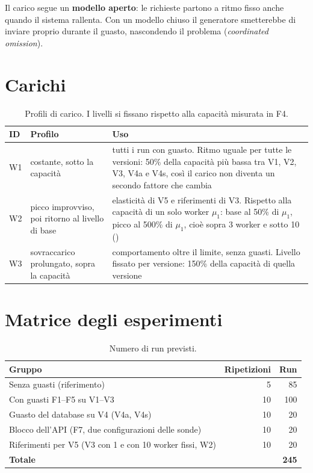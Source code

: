 Il carico segue un \textbf{modello aperto}: le richieste partono a ritmo fisso anche quando il sistema rallenta. Con un modello chiuso il generatore smetterebbe di inviare proprio durante il guasto, nascondendo il problema (\textit{coordinated omission}).

\section{Carichi}

\begin{table}[htbp]
\centering
\caption{Profili di carico. I livelli si fissano rispetto alla capacità misurata in F4.}
\label{tab:carichi}
\begin{tabularx}{\linewidth}{@{}llL@{}}
\toprule
\textbf{ID} & \textbf{Profilo} & \textbf{Uso} \\
\midrule
W1 & costante, sotto la capacità & tutti i run con guasto. Ritmo uguale per tutte le versioni: 50\% della capacità più bassa tra V1, V2, V3, V4a e V4s, così il carico non diventa un secondo fattore che cambia \\
W2 & picco improvviso, poi ritorno al livello di base & elasticità di V5 e riferimenti di V3. Rispetto alla capacità di un solo worker $\mu_1$: base al 50\% di $\mu_1$, picco al 500\% di $\mu_1$, cioè sopra 3 worker e sotto 10 () \\
W3 & sovraccarico prolungato, sopra la capacità & comportamento oltre il limite, senza guasti. Livello fissato per versione: 150\% della capacità di quella versione \\
\bottomrule
\end{tabularx}
\end{table}

\section{Matrice degli esperimenti}

\begin{table}[htbp]
\centering
\caption{Numero di run previsti.}
\label{tab:matrice}
\begin{tabular}{@{}lrr@{}}
\toprule
\textbf{Gruppo} & \textbf{Ripetizioni} & \textbf{Run} \\
\midrule
Senza guasti (riferimento) & 5 & 85 \\
Con guasti F1--F5 su V1--V3 & 10 & 100 \\
Guasto del database su V4 (V4a, V4s) & 10 & 20 \\
Blocco dell'API (F7, due configurazioni delle sonde) & 10 & 20 \\
Riferimenti per V5 (V3 con 1 e con 10 worker fissi, W2) & 10 & 20 \\
\midrule
\textbf{Totale} & & \textbf{245} \\
\bottomrule
\end{tabular}
\end{table}

